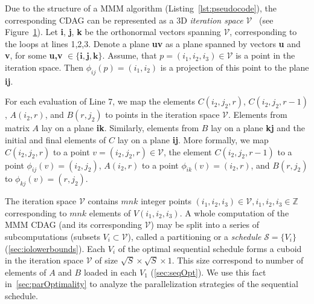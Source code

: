 \documentclass[sigplan,review,anonymous,10pt]{acmart}\settopmatter{printfolios=true,printccs=false,printacmref=false}
\begin{document}
\begin{figure}
	\label{fig:iterationSpace}
\end{figure}
%

 Due to the
structure of a MMM algorithm (Listing~\ref{lst:pseudocode}), the corresponding 
CDAG can be represented as a 3D \emph{iteration
space} $\mathcal{V}$~\cite{tiling} (see Figure~\ref{fig:iterationSpace}). Let 
\textbf{i}, \textbf{j}, \textbf{k} be the orthonormal vectors spanning 
$\mathcal{V}$,
corresponding to the loops at lines 1,2,3.  Denote a plane \textbf{uv} as a
plane spanned by vectors \textbf{u} and \textbf{v}, for some \textbf{u,v} $\in
\{\mathbf{i,j,k}\}$. Assume, that $p = (i_1,i_2,i_3) \in \mathcal{V}$ is a point
in the iteration space. Then $\phi_{ij}(p) = (i_1,i_2)$ is a projection of this
point to the plane \textbf{ij}.

For each evaluation of Line 7, we map the elements $C(i_2,j_2,r)$, 
$C(i_2,j_2,r-1)$, $A(i_2,r)$, and $B(r,j_2)$ to points in the iteration space 
$\mathcal{V}$. Elements from matrix $A$ lay on a plane \textbf{ik}. Similarly, 
elements from $B$ lay on a plane \textbf{kj} and the initial and final elements 
of $C$ lay on a plane \textbf{ij}. More formally, we map
$C(i_2,j_2,r)$ to a point
$v = (i_2,j_2,r) \in \mathcal{V}$, the element $C(i_2,j_2,r-1)$ to a point 
$\phi_{ij}(v) =
(i_2,j_2)$, $A(i_2,r)$ to a point $\phi_{ik}(v) = (i_2,r)$, and $B(r,j_2)$
to $\phi_{kj}(v) = (r,j_2)$.

The iteration space $\mathcal{V}$ contains $mnk$ integer points \linebreak
$(i_1,i_2,i_3) \in \mathcal{V}, i_1,i_2,i_3 \in \mathbb{Z}$ corresponding to 
$mnk$
elements of $V(i_1,i_2,i_3)$.  A whole computation of the MMM CDAG (and its
corresponding  $\mathcal{V}$) may be split into a series of subcomputations
(subsets $V_i \subset \mathcal{V}$), called a partitioning or a \emph{schedule}
$\mathcal{S} = \{V_i\}$ (\cref{sec:iolowerbounds}). Each $V_i$ of the optimal 
sequential schedule forms a cuboid in the iteration space $\mathcal{V}$ of 
size $\sqrt{S} \times \sqrt{S} \times 1$. This size correspond to number of 
elements of $A$ and $B$ loaded in each $V_1$ (\cref{sec:seqOpt}). We use this 
fact in~\cref{sec:parOptimality} to analyze the parallelization strategies of 
the sequential schedule.
\end{document}
